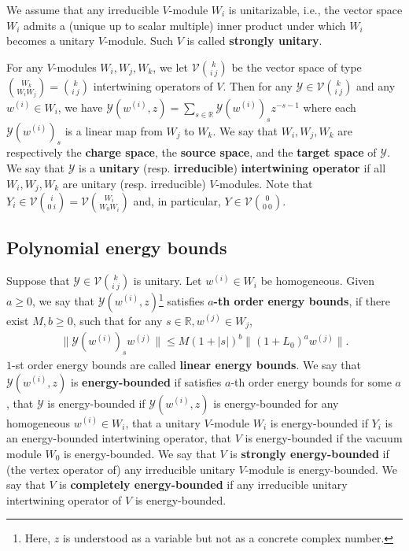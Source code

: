 \documentclass[12pt,a4paper]{article}
\theoremstyle{definition}
\theoremstyle{plain}
\newcommand{\mc}{\mathcal}
\newcommand{\mbb}{\mathbb}
\numberwithin{equation}{subsection}
\begin{document}
We assume that any irreducible $V$-module $W_i$ is unitarizable, i.e., the vector space $W_i$ admits a (unique up to scalar multiple) inner product under which $W_i$ becomes a unitary $V$-module. Such $V$ is called \textbf{strongly unitary}. 



For any $V$-modules $W_i,W_j,W_k$, we let $\mc V{k\choose i~j}$ be the vector space of type ${W_k\choose W_iW_j}={k\choose i~j}$ intertwining operators of $V$.  Then for any $\mc Y\in\mc V{k\choose i~j}$  and any $w^{(i)}\in W_i$, we have $\mc Y(w^{(i)},z)=\sum_{s\in\mbb R}\mc Y(w^{(i)})_sz^{-s-1}$ where each $\mc Y(w^{(i)})_s$ is a linear map from $W_j$ to $W_k$. We say that $W_i,W_j,W_k$ are respectively the \textbf{charge space}, the \textbf{source space}, and the \textbf{target space} of $\mc Y$. We say that $\mc Y$ is a \textbf{unitary} (resp. \textbf{irreducible}) \textbf{intertwining operator} if all $W_i,W_j,W_k$ are unitary (resp. irreducible) $V$-modules. Note that $Y_i\in\mc V{i\choose 0~i}=\mc V{W_i\choose W_0W_i}$ and, in particular, $Y\in\mc V{0\choose 0~0}$. 


\subsection{Polynomial energy bounds}\label{lb69}

Suppose that $\mc Y\in\mc V{k\choose i~j}$ is unitary. Let $w^{(i)}\in W_i$ be homogeneous. Given $a\geq 0$, we say that $\mc Y(w^{(i)},z)$\footnote{Here, $z$ is understood as a variable but not as a concrete complex number.} satisfies \textbf{$a$-th order energy bounds}, if there exist $M,b\geq0$, such that for any $s\in\mathbb R,w^{(j)}\in W_j$, 
\begin{align}
\lVert \mc Y(w^{(i)})_sw^{(j)} \lVert\leq M(1+|s|)^b\lVert (1+L_0)^aw^{(j)}\lVert.
\end{align}
$1$-st order energy bounds are called \textbf{linear energy bounds}. We say that $\mc Y(w^{(i)},z)$ is \textbf{energy-bounded} if satisfies $a$-th order energy bounds for some $a$, that $\mc Y$ is energy-bounded if $\mc Y(w^{(i)},z)$ is energy-bounded for any homogeneous $w^{(i)}\in W_i$, that a unitary $V$-module $W_i$ is energy-bounded if $Y_i$ is an energy-bounded intertwining operator, that $V$ is energy-bounded if the vacuum module $W_0$ is energy-bounded. We say that $V$ is \textbf{strongly energy-bounded} if (the vertex operator of) any irreducible unitary $V$-module is energy-bounded. We say that $V$ is \textbf{completely energy-bounded} if any irreducible unitary intertwining operator of $V$ is energy-bounded.
\end{document}
